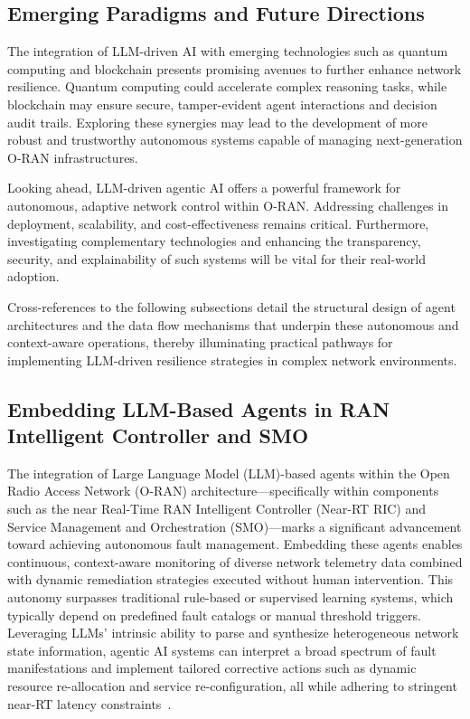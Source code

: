 \documentclass[sigconf]{acmart}
\begin{document}
\subsection{Emerging Paradigms and Future Directions}
The integration of LLM-driven AI with emerging technologies such as quantum computing and blockchain presents promising avenues to further enhance network resilience. Quantum computing could accelerate complex reasoning tasks, while blockchain may ensure secure, tamper-evident agent interactions and decision audit trails. Exploring these synergies may lead to the development of more robust and trustworthy autonomous systems capable of managing next-generation O-RAN infrastructures.

Looking ahead, LLM-driven agentic AI offers a powerful framework for autonomous, adaptive network control within O-RAN. Addressing challenges in deployment, scalability, and cost-effectiveness remains critical. Furthermore, investigating complementary technologies and enhancing the transparency, security, and explainability of such systems will be vital for their real-world adoption.

Cross-references to the following subsections detail the structural design of agent architectures and the data flow mechanisms that underpin these autonomous and context-aware operations, thereby illuminating practical pathways for implementing LLM-driven resilience strategies in complex network environments.

\subsection{Embedding LLM-Based Agents in RAN Intelligent Controller and SMO}

The integration of Large Language Model (LLM)-based agents within the Open Radio Access Network (O-RAN) architecture—specifically within components such as the near Real-Time RAN Intelligent Controller (Near-RT RIC) and Service Management and Orchestration (SMO)—marks a significant advancement toward achieving autonomous fault management. Embedding these agents enables continuous, context-aware monitoring of diverse network telemetry data combined with dynamic remediation strategies executed without human intervention. This autonomy surpasses traditional rule-based or supervised learning systems, which typically depend on predefined fault catalogs or manual threshold triggers. Leveraging LLMs’ intrinsic ability to parse and synthesize heterogeneous network state information, agentic AI systems can interpret a broad spectrum of fault manifestations and implement tailored corrective actions such as dynamic resource re-allocation and service re-configuration, all while adhering to stringent near-RT latency constraints~\cite{ref55}.
\end{document}
